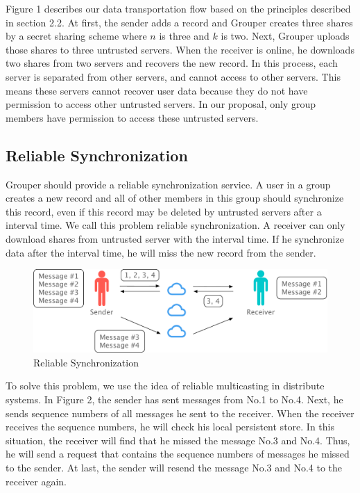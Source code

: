 \documentclass[twocolumn,10pt]{article}
\begin{document}
Figure 1 describes our data transportation flow based on the principles described in section 2.2. At first, the sender adds a record and Grouper creates three shares by a secret sharing scheme where $n$ is three and $k$ is two. Next, Grouper uploads those shares to three untrusted servers. When the receiver is online, he downloads two shares from two servers and recovers the new record. In this process, each server is separated from other servers, and cannot access to other servers. This means these servers cannot recover user data because they do not have permission to access other untrusted servers. In our proposal, only group members have permission to access these untrusted servers.

\subsection{Reliable Synchronization}
Grouper should provide a reliable synchronization service. A user in a group creates a new record and all of other members in this group should synchronize this record, even if this record may be deleted by untrusted servers after a interval time. We call this problem reliable synchronization. A receiver can only download shares from untrusted server with the interval time. If he synchronize data after the interval time, he will miss the new record from the sender.

\begin{figure}[!htb]
	\centering
	\includegraphics[scale=0.3]{reliable_sync}
	\caption{Reliable Synchronization}
\end{figure}

To solve this problem, we use the idea of reliable multicasting in distribute systems. In Figure 2, the sender has sent messages from No.1 to No.4. Next, he sends sequence numbers of all messages he sent to the receiver. When the receiver receives the sequence numbers, he will check his local persistent store. In this situation, the receiver will find that he missed the message No.3 and No.4. Thus, he will send a request that contains the sequence numbers of messages he missed to the sender. At last, the sender will resend the message No.3 and No.4 to the receiver again.
\end{document}
